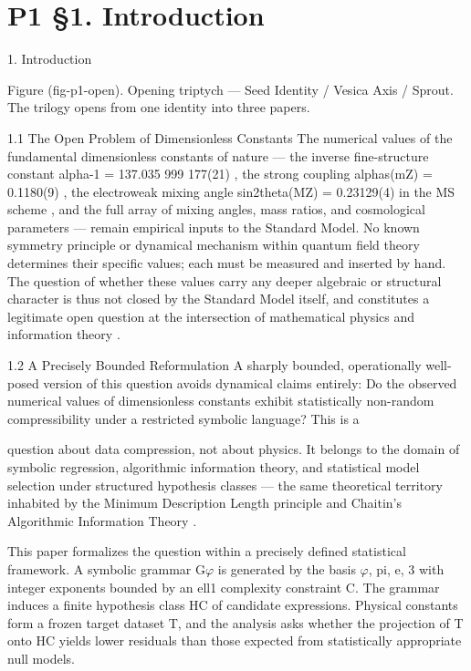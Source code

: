 
\section{P1 §1. Introduction}

1. Introduction

    Figure (fig-p1-open). Opening triptych --- Seed Identity / Vesica Axis / Sprout. The trilogy opens
                                 from one identity into three papers.

  1.1 The Open Problem of Dimensionless Constants
  The numerical values of the fundamental dimensionless constants of nature --- the
  inverse fine-structure constant alpha-1 = 137.035 999 177(21) \citep{codata2022},
  the strong coupling alphas(mZ) = 0.1180(9) \citep{pdg2024}, the electroweak mixing angle
  sin2theta(MZ) = 0.23129(4) in the MS scheme \citep{pdg2024}, and the full array of mixing
  angles, mass ratios, and cosmological parameters --- remain empirical inputs to the
  Standard Model. No known symmetry principle or dynamical mechanism within
  quantum field theory determines their specific values; each must be measured and
  inserted by hand. The question of whether these values carry any deeper algebraic or
  structural character is thus not closed by the Standard Model itself, and constitutes a
  legitimate open question at the intersection of mathematical physics and information
  theory \citep{pdg2024}.

  1.2 A Precisely Bounded Reformulation
  A sharply bounded, operationally well-posed version of this question avoids dynamical
  claims entirely: Do the observed numerical values of dimensionless constants exhibit
  statistically non-random compressibility under a restricted symbolic language? This is a

  question about data compression, not about physics. It belongs to the domain of
  symbolic regression, algorithmic information theory, and statistical model selection
  under structured hypothesis classes --- the same theoretical territory inhabited by the
  Minimum Description Length principle \citep{barron1998,grunwald2007} and Chaitin's Algorithmic Information
  Theory \citep{chaitin1987}.

  This paper formalizes the question within a precisely defined statistical framework. A
  symbolic grammar G$\varphi$ is generated by the basis {$\varphi$, pi, e, 3} with integer exponents
  bounded by an ell1 complexity constraint C. The grammar induces a finite hypothesis
  class HC of candidate expressions. Physical constants form a frozen target dataset T,
  and the analysis asks whether the projection of T onto HC yields lower residuals than
  those expected from statistically appropriate null models.

